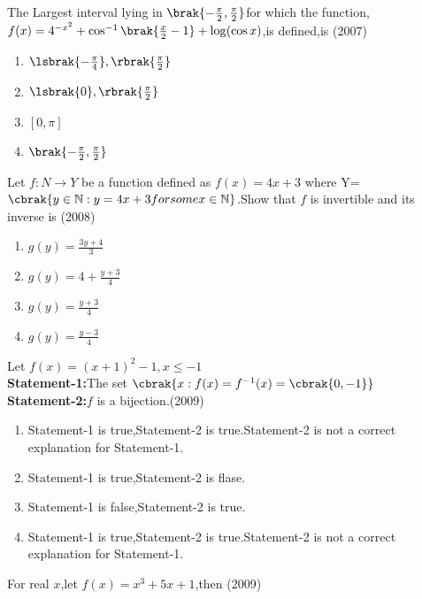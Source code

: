      \item The Largest interval lying in $\brak{-\frac{\pi}{2},\frac{\pi}{2}}$for which the function,
	     $f(x)=4^{-x^{2}}+\cos^{-1}\brak{\frac{x}{2}-1}+\log(\cos{x})$,is defined,is \hfill(2007)
	     \begin{enumerate}
		     \item $\lsbrak{-\frac{\pi}{4}},\rbrak{\frac{\pi}{2}}$ \\
		     \item $\lsbrak{0},\rbrak{\frac{\pi}{2}}$ \\
		     \item $[0,\pi]$ \\
		     \item $\brak{-\frac{\pi}{2},\frac{\pi}{2}}$
	     \end{enumerate}
     \item Let $f:N\to Y$ be a function defined as $f(x)=4x+3$ where Y=$\cbrak{y\in \mathbb{N}:y=4x+3 for some x\in \mathbb{N}}$.Show that $f$ is invertible and its inverse is \hfill(2008)
	     \begin{enumerate}
		     \item $g(y)=\frac{3y+4}{3}$ \\
		     \item $g(y)=4+\frac{y+3}{4}$ \\
		     \item $g(y)=\frac{y+3}{4}$ \\
		     \item $g(y)=\frac{y-3}{4}$
	     \end{enumerate}
     \item Let $f(x)=(x+1)^{2}-1,x\leq-1$\\
	     \textbf{Statement-1:}The set $\cbrak{x:f(x)=f^{-1}(x)=\cbrak{0,-1}}$\\
	     \textbf{Statement-2:}$f$ is a bijection.\hfill(2009)
	     \begin{enumerate}
		     \item Statement-1 is true,Statement-2 is true.Statement-2 is  not a correct explanation for Statement-1.
		     \item Statement-1 is true,Statement-2 is flase.
		     \item Statement-1 is false,Statement-2 is true.
		     \item Statement-1 is true,Statement-2 is true.Statement-2 is not a correct explanation for Statement-1.
	     \end{enumerate}
     \item For real $x$,let $f(x)=x^{3}+5x+1$,then \hfill(2009)
